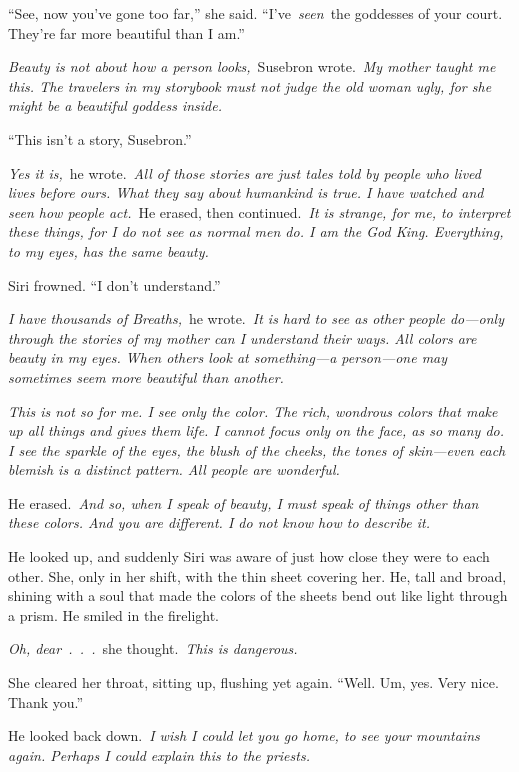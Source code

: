 “See, now you’ve gone too far,” she said. “I’ve~\textit{seen}~the goddesses of your court. They’re far more beautiful than I am.”

\textit{Beauty is not about how a person looks,}~Susebron wrote.~\textit{My mother taught me this. The travelers in my storybook must not judge the old woman ugly, for she might be a beautiful goddess inside.}

“This isn’t a story, Susebron.”

\textit{Yes it is,}~he wrote.~\textit{All of those stories are just tales told by people who lived lives before ours. What they say about humankind is true. I have watched and seen how people act.}~He erased, then continued.~\textit{It is strange, for me, to interpret these things, for I do not see as normal men do. I am the God King. Everything, to my eyes, has the same beauty.}

Siri frowned. “I don’t understand.”

\textit{I have thousands of Breaths,}~he wrote.~\textit{It is hard to see as other people do—only through the stories of my mother can I understand their ways. All colors are beauty in my eyes. When others look at something—a person—one may sometimes seem more beautiful than another.}

\textit{This is not so for me. I see only the color. The rich, wondrous colors that make up all things and gives them life. I cannot focus only on the face, as so many do. I see the sparkle of the eyes, the blush of the cheeks, the tones of skin—even each blemish is a distinct pattern. All people are wonderful.}

He erased.~\textit{And so, when I speak of beauty, I must speak of things other than these colors. And you are different. I do not know how to describe it.}

He looked up, and suddenly Siri was aware of just how close they were to each other. She, only in her shift, with the thin sheet covering her. He, tall and broad, shining with a soul that made the colors of the sheets bend out like light through a prism. He smiled in the firelight.

\textit{Oh, dear~.~.~.}~she thought.~\textit{This is dangerous.}

She cleared her throat, sitting up, flushing yet again. “Well. Um, yes. Very nice. Thank you.”

He looked back down.~\textit{I wish I could let you go home, to see your mountains again. Perhaps I could explain this to the priests.}


